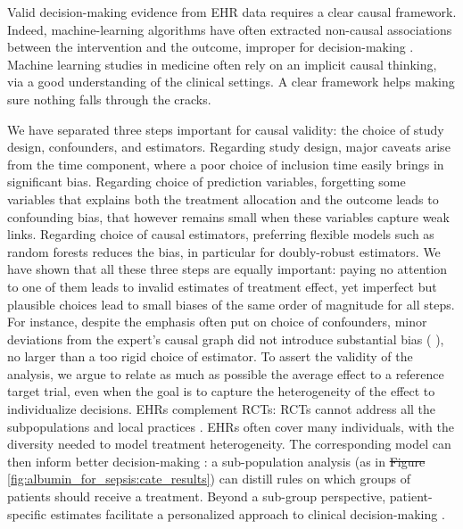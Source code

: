 \documentclass[10pt,letterpaper]{article}
\providecommand{\DIFaddtex}[1]{{\protect\color{blue}\uwave{#1}}} %
\providecommand{\DIFdeltex}[1]{{\protect\color{red}\sout{#1}}}                      %
\providecommand{\DIFaddbegin}{} %
\providecommand{\DIFaddend}{} %
\providecommand{\DIFdelbegin}{} %
\providecommand{\DIFdelend}{} %
\providecommand{\DIFadd}[1]{\texorpdfstring{\DIFaddtex{#1}}{#1}} %
\providecommand{\DIFdel}[1]{\texorpdfstring{\DIFdeltex{#1}}{}} %
\newcommand{\DIFscaledelfig}{0.5}
\newlength{\DIFdelgraphicswidth} %
\newlength{\DIFdelgraphicsheight} %
\newcommand{\DIFaddincludegraphics}[2][]{{\color{blue}\fbox{\DIFOincludegraphics[#1]{#2}}}} %
\newcommand{\DIFdelincludegraphics}[2][]{%
\sbox{\DIFdelgraphicsbox}{\DIFOincludegraphics[#1]{#2}}%
\settoboxwidth{\DIFdelgraphicswidth}{\DIFdelgraphicsbox} %
\settoboxtotalheight{\DIFdelgraphicsheight}{\DIFdelgraphicsbox} %
\scalebox{\DIFscaledelfig}{%
\parbox[b]{\DIFdelgraphicswidth}{\usebox{\DIFdelgraphicsbox}\\[-\baselineskip] \rule{\DIFdelgraphicswidth}{0em}}\llap{\resizebox{\DIFdelgraphicswidth}{\DIFdelgraphicsheight}{%
\setlength{\unitlength}{\DIFdelgraphicswidth}%
\begin{picture}(1,1)%
\thicklines\linethickness{2pt} %
{\color[rgb]{1,0,0}\put(0,0){\framebox(1,1){}}}%
{\color[rgb]{1,0,0}\put(0,0){\line( 1,1){1}}}%
{\color[rgb]{1,0,0}\put(0,1){\line(1,-1){1}}}%
\end{picture}%
}\hspace*{3pt}}} %
} %
\DeclareRobustCommand{\DIFaddbegin}{\DIFOaddbegin \let\includegraphics\DIFaddincludegraphics} %
\DeclareRobustCommand{\DIFaddend}{\DIFOaddend \let\includegraphics\DIFOincludegraphics} %
\DeclareRobustCommand{\DIFdelbegin}{\DIFOdelbegin \let\includegraphics\DIFdelincludegraphics} %
\DeclareRobustCommand{\DIFdelend}{\DIFOaddend \let\includegraphics\DIFOincludegraphics} %
\begin{document}
Valid decision-making evidence from EHR data requires a clear causal framework.
Indeed, machine-learning algorithms have often extracted non-causal associations
between the intervention and the outcome, improper for decision-making
\cite{winkler2019association,badgeley2019deep,obermeyer2019dissecting}.
Machine learning studies in medicine often rely on an implicit causal
thinking, via a good understanding of the clinical settings.
A clear framework helps making
sure nothing falls through the cracks.

We have separated three steps important for causal validity: the choice
of study design, confounders, and estimators.
%
Regarding study design, major caveats arise from the time component,
where a poor choice of inclusion time easily brings in significant bias. Regarding choice of prediction
variables, forgetting some variables that explains both the treatment
allocation and the outcome leads to confounding bias, that however
remains small when these
variables capture weak links. Regarding choice of causal estimators,
preferring flexible models such as random forests reduces the bias, in
particular for doubly-robust estimators.
%
We have shown that all these three steps are equally important: paying no
attention to one of them leads to invalid estimates of treatment effect,
yet imperfect but plausible choices lead to small biases of the same
order of magnitude for all steps.
%
For instance, despite the emphasis often put on choice of confounders,
minor deviations from the expert's causal graph did not introduce
substantial bias (\DIFdelbegin %
\DIFdelend \DIFaddbegin \DIFadd{\ref{fig:vibration:confounders}}\DIFaddend ), no larger than a too
rigid choice of estimator.
To assert the validity of the analysis, we argue to relate as much as
possible the average effect to a reference target trial, even when the
goal is to capture the heterogeneity of the effect to individualize
decisions.
EHRs complement RCTs: RCTs cannot address all the
subpopulations and local practices
\cite{travers2007external,kennedy2015literature}. EHRs often cover many
individuals, with the diversity needed to model treatment
heterogeneity. The corresponding model can then inform better
decision-making \cite{prosperi2020causal}: a sub-population analysis  (as in \DIFdelbegin \DIFdel{Figure
}\DIFdelend \DIFaddbegin \DIFadd{Fig
}\DIFaddend \ref{fig:albumin_for_sepsis:cate_results}) can distill rules on which groups
of patients should receive a treatment. Beyond a sub-group perspective,
patient-specific estimates facilitate a personalized approach
to clinical decision-making \cite{kent2018personalized}.
\end{document}
